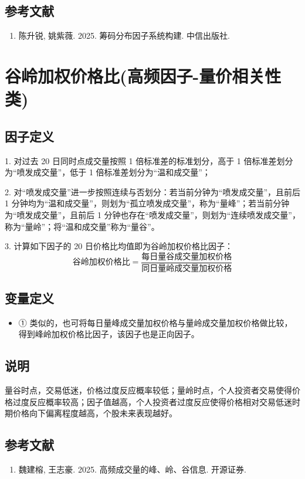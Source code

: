 \documentclass{article}
\begin{document}
\subsection{参考文献}
\begin{enumerate}
    \item 陈升锐, 姚紫薇. 2025. 筹码分布因子系统构建. 中信出版社.
\end{enumerate}

\section{谷岭加权价格比(高频因子-量价相关性类)}

\subsection{因子定义}


1. 对过去 20 日同时点成交量按照 1 倍标准差的标准划分，高于 1 倍标准差划分为“喷发成交量”，低于 1 倍标准差划分为“温和成交量”；

2. 对“喷发成交量”进一步按照连续与否划分：若当前分钟为“喷发成交量”，且前后 1 分钟均为“温和成交量”，则划为“孤立喷发成交量”，称为“量峰”；若当前分钟为“喷发成交量”，且前后 1 分钟也存在“喷发成交量”，则划为“连续喷发成交量”，称为“量岭”；将“温和成交量”称为“量谷”。

3. 计算如下因子的 20 日价格比均值即为谷岭加权价格比因子：
\begin{equation}
    \text{谷岭加权价格比} = \frac{\text{每日量谷成交量加权价格}}{\text{同日量岭成交量加权价格}}
\end{equation}

\subsection{变量定义}
\begin{itemize}
    \item ① 类似的，也可将每日量峰成交量加权价格与量岭成交量加权价格做比较，得到峰岭加权价格比因子，该因子也是正向因子。
\end{itemize}

\subsection{说明}
量谷时点，交易低迷，价格过度反应概率较低；量岭时点，个人投资者交易使得价格过度反应概率较高；因子值越高，个人投资者过度反应使得价格相对交易低迷时期价格向下偏离程度越高，个股未来表现越好。

\subsection{参考文献}
\begin{enumerate}
    \item 魏建榕, 王志豪. 2025. 高频成交量的峰、岭、谷信息. 开源证券.
\end{enumerate}
\end{document}
